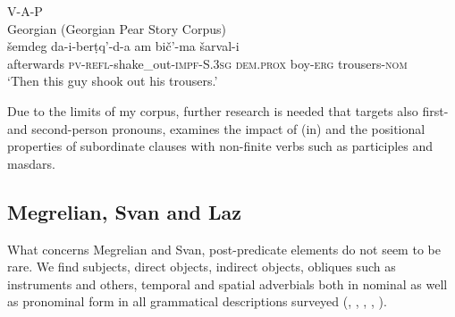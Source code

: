 \documentclass[output=paper,colorlinks,citecolor=brown,draftmode]{langscibook}
\begin{document}
\ea\label{EC:ex:4}
V-A-P\\
Georgian (Georgian Pear Story Corpus) \\
\gll šemdeg da-i-berṭq'-d-a am bič'-ma šarval-i \\
afterwards \textsc{pv-refl-}shake\_out\textsc{-impf-S.3sg} \textsc{dem.prox} boy\textsc{-erg} trousers\textsc{-nom} \\
\glt `Then this guy shook out his trousers.'
\z

Due to the limits of my corpus, further research is needed that targets also first- and second-person pronouns, examines the impact of (in) and the positional properties of subordinate clauses with non-finite verbs such as participles and masdars.


\subsection{Megrelian, Svan and Laz}\label{EC:ss:2.4}

What concerns Megrelian and Svan, post-predicate elements do not seem to be rare. We find subjects, direct objects, indirect objects, obliques such as instruments and others, temporal and spatial adverbials both in nominal as well as pronominal form in all grammatical descriptions surveyed (\citealt{harris_mingrelian_1991}, \citealt{holisky_laz_1991}, \citealt{rostovtsev-popiel_megrelian_2021}, \citealt{tuite_short_1998}, \citealt{schmidt_svan_1991}).
\end{document}
